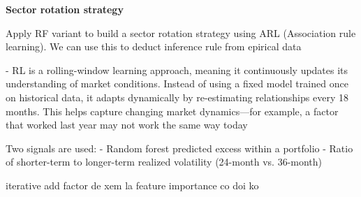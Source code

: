 \textbf{Sector rotation strategy}

Apply RF variant to build a sector rotation strategy using ARL (Association rule learning). We can use this to deduct inference rule from epirical data

- RL is a rolling-window learning approach, meaning it continuously updates its understanding of market conditions.
Instead of using a fixed model trained once on historical data, it adapts dynamically by re-estimating relationships every 18 months.
This helps capture changing market dynamics—for example, a factor that worked last year may not work the same way today

Two signals are used:
- Random forest predicted excess within a portfolio
- Ratio of shorter-term to longer-term realized volatility (24-month vs. 36-month)

iterative add factor de xem la feature importance co doi ko 
